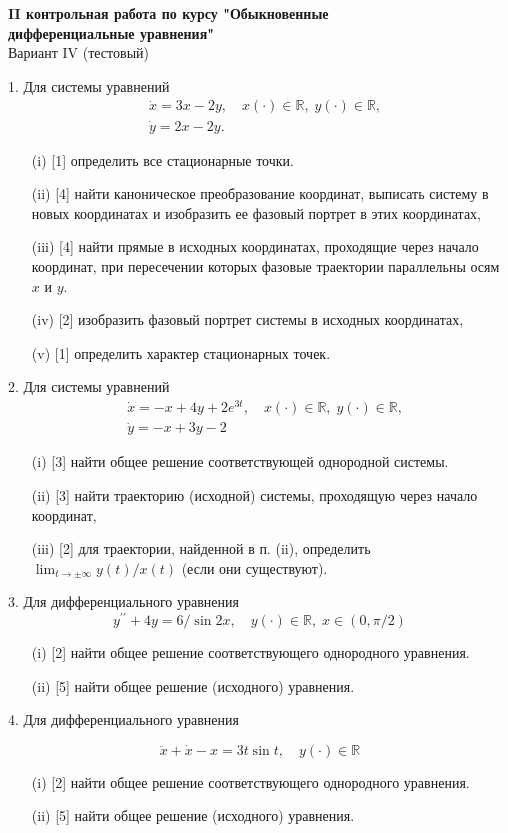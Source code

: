 \documentclass[a4paper, 12pt]{article}
\begin{document}
\begin{center}


\textbf{II контрольная работа по курсу "Обыкновенные \\
дифференциальные уравнения"
}\\
{Вариант IV (тестовый)}
\end{center}
1. Для системы уравнений
$$
\begin{aligned}
&\dot{x}=3 x-2 y, \quad x(\cdot) \in \mathbb{R}, \; y(\cdot) \in \mathbb{R}, \\
&\dot{y}=2 x-2 y .
\end{aligned}
$$
\begin{itemize}
\item [(i)][1] определить все стационарные точки.
\item [(ii)][4] найти каноническое преобразование координат, выписать систему в новых координатах и изобразить ее фазовый портрет в этих координатах,
\item [(iii)][4] найти прямые в исходных координатах, проходящие через начало координат, при пересечении которых фазовые траектории параллельны осям $x$ и $y$.
\item [(iv)][2]  изобразить фазовый портрет системы в исходных координатах,
\item [(v)][1]  определить характер стационарных точек.
\end{itemize}
2. Для системы уравнений
$$
\begin{aligned}
&\dot{x}=-x+4 y+2 e^{3 t}, \quad x(\cdot) \in \mathbb{R},\; y(\cdot) \in \mathbb{R}, \\
&\dot{y}=-x+3 y-2
\end{aligned}
$$
\begin{itemize}
\item [(i)][3] найти общее решение соответствующей однородной системы.
\item [(ii)][3] найти траекторию (исходной) системы, проходящую через начало координат,
\item [(iii)][2] для траектории, найденной в п. (ii), определить $\lim _{t \rightarrow \pm \infty} y(t) / x(t)$ (если они существуют).
\end{itemize}
3. Для дифференциального уравнения
$$
y^{\prime \prime}+4 y=6 / \sin 2 x, \quad y(\cdot) \in \mathbb{R},\; x \in(0, \pi / 2)
$$
\begin{itemize}
\item [(i)][2]  найти общее решение соответствующего однородного уравнения.
\item [(ii)][5]  найти общее решение (исходного) уравнения.
\end{itemize}
4. Для дифференциального уравнения

$$
\ddot{x}+\dot{x}-x=3 t \sin t, \quad y(\cdot) \in \mathbb{R}
$$
\begin{itemize}
\item [(i)][2]  найти общее решение соответствующего однородного уравнения.
\item [(ii)][5] найти общее решение (исходного) уравнения.

\end{itemize}
\end{document}
